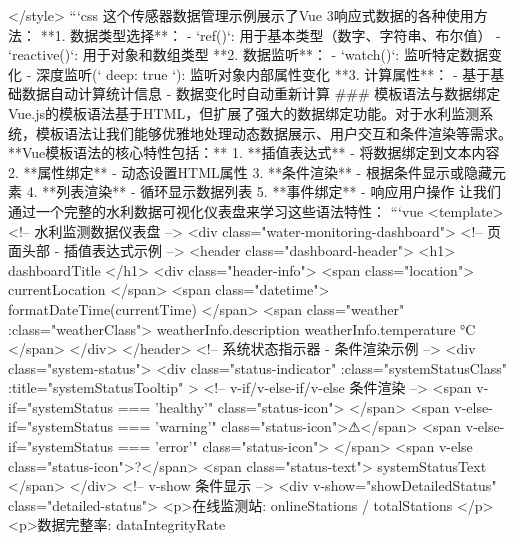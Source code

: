 </style> ```css 这个传感器数据管理示例展示了Vue 3响应式数据的各种使用方法： **1. 数据类型选择**： - `ref()`: 用于基本类型（数字、字符串、布尔值） - `reactive()`: 用于对象和数组类型 **2. 数据监听**： - `watch()`: 监听特定数据变化 - 深度监听(`{ deep: true }`): 监听对象内部属性变化 **3. 计算属性**： - 基于基础数据自动计算统计信息 - 数据变化时自动重新计算 ### 模板语法与数据绑定 Vue.js的模板语法基于HTML，但扩展了强大的数据绑定功能。对于水利监测系统，模板语法让我们能够优雅地处理动态数据展示、用户交互和条件渲染等需求。 **Vue模板语法的核心特性包括：** 1. **插值表达式** - 将数据绑定到文本内容 2. **属性绑定** - 动态设置HTML属性 3. **条件渲染** - 根据条件显示或隐藏元素 4. **列表渲染** - 循环显示数据列表 5. **事件绑定** - 响应用户操作 让我们通过一个完整的水利数据可视化仪表盘来学习这些语法特性： ```vue <template> <!-- 水利监测数据仪表盘 --> <div class="water-monitoring-dashboard"> <!-- 页面头部 - 插值表达式示例 --> <header class="dashboard-header"> <h1>{{ dashboardTitle }}</h1> <div class="header-info"> <span class="location">{{ currentLocation }}</span> <span class="datetime">{{ formatDateTime(currentTime) }}</span> <span class="weather" :class="weatherClass"> {{ weatherInfo.description }} {{ weatherInfo.temperature }}°C </span> </div> </header> <!-- 系统状态指示器 - 条件渲染示例 --> <div class="system-status"> <div class="status-indicator" :class="systemStatusClass" :title="systemStatusTooltip" > <!-- v-if/v-else-if/v-else 条件渲染 --> <span v-if="systemStatus === 'healthy'" class="status-icon"> </span> <span v-else-if="systemStatus === 'warning'" class="status-icon">⚠</span> <span v-else-if="systemStatus === 'error'" class="status-icon"> </span> <span v-else class="status-icon">?</span> <span class="status-text">{{ systemStatusText }}</span> </div> <!-- v-show 条件显示 --> <div v-show="showDetailedStatus" class="detailed-status"> <p>在线监测站: {{ onlineStations }} / {{ totalStations }}</p> <p>数据完整率: {{ dataIntegrityRate }}%